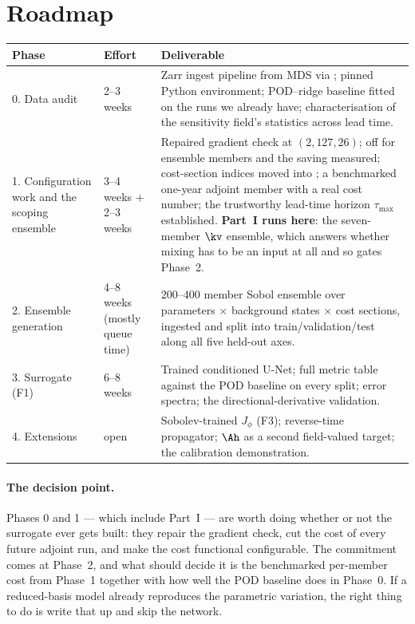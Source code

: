 \section{Roadmap}

\begin{center}
\begin{tabularx}{\textwidth}{@{}Y{0.6}Y{0.55}Y{1.85}@{}}
\toprule
\textbf{Phase} & \textbf{Effort} & \textbf{Deliverable}\\
. Data audit
  & 2--3 weeks
  & Zarr ingest pipeline from MDS via ; pinned Python
    environment; POD--ridge baseline fitted on the runs we already have;
    characterisation of the sensitivity field's statistics across lead time.\\
1. Configuration work
    and the scoping ensemble
  & 3--4 weeks
    $+$ 2--3 weeks
  & Repaired gradient check at $(2,127,26)$;  off for ensemble
    members and the saving measured; cost-section indices moved into
    ; a benchmarked one-year adjoint member with a real cost
    number; the trustworthy lead-time horizon $\tau_{\max}$ established.
    \textbf{Part~I runs here}: the seven-member $\kv$ ensemble, which answers
    whether mixing has to be an input at all and so gates Phase~2.\\
2. Ensemble generation
  & 4--8 weeks (mostly queue time)
  & $200$--$400$ member Sobol ensemble over parameters $\times$ background
    states $\times$ cost sections, ingested and split into
    train/validation/test along all five held-out axes.\\
3. Surrogate (F1)
  & 6--8 weeks
  & Trained conditioned U-Net; full metric table against the POD baseline on
    every split; error spectra; the directional-derivative validation.\\
4. Extensions
  & open
  & Sobolev-trained $J_\phi$ (F3); reverse-time propagator; $\Ah$ as a second
    field-valued target; the calibration demonstration.\\
\bottomrule
\end{tabularx}
\end{center}

\paragraph{The decision point.}
Phases 0 and 1 --- which include Part~I --- are worth doing whether or not the
surrogate ever gets built:
they repair the gradient check, cut the cost of every future adjoint run, and
make the cost functional configurable. The commitment comes at Phase~2, and
what should decide it is the benchmarked per-member cost from Phase~1 together
with how well the POD baseline does in Phase~0. If a reduced-basis model
already reproduces the parametric variation, the right thing to do is write
that up and skip the network.

